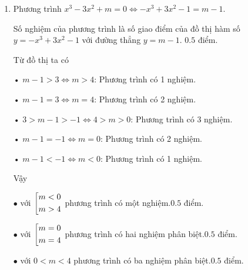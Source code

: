 \begin{ex}[4 điểm]
{\begin{enumerate}
\begin{center}
\end{center}
\dotfill $1,0$ điểm.
\item 
Phương trình $x^3-3x^2+m=0\Leftrightarrow -x^3+3x^2-1=m-1.$

Số nghiệm của phương trình là số giao điểm của đồ thị hàm số $y=-x^3+3x^2-1$ với đường thẳng $y = m - 1$. \dotfill $0.5$ điểm.

Từ đồ thị ta có 


• $m-1>3\Leftrightarrow m>4$: Phương trình có 1 nghiệm.

• $m-1=3\Leftrightarrow m=4$: Phương trình có 2 nghiệm.

• $3>m-1>-1\Leftrightarrow 4>m>0$: Phương trình có 3 nghiệm.

• $m-1=-1\Leftrightarrow m=0$: Phương trình có 2 nghiệm.

• $m-1<-1\Leftrightarrow m<0$: Phương trình có 1 nghiệm.

Vậy 

$\bullet$ với $\left[\begin{aligned}&m<0\\&m>4\end{aligned}\right.$ phương trình có một nghiệm.\dotfill $0.5$ điểm.

$\bullet$ với $\left[\begin{aligned}& m=0\\&m=4\end{aligned}\right.$ phương trình có hai nghiệm phân biệt.\dotfill $0.5$ điểm.

$\bullet$ với $0<m<4$ phương trình có ba nghiệm phân biệt.\dotfill $0.5$ điểm.
\end{enumerate}
}
\end{ex}

